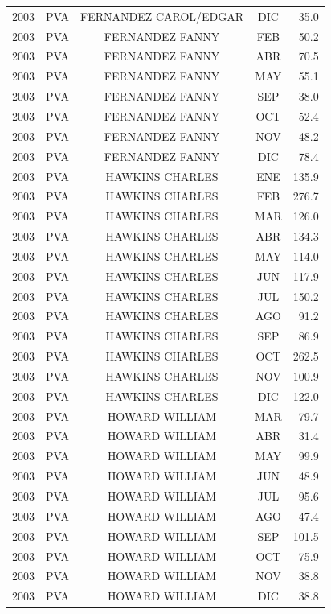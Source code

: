 \documentclass[12pt,]{article}
\begin{document}
\begin{table}[ht]
{\begin{tabular}{lcccr}
  2003 & PVA & FERNANDEZ CAROL/EDGAR & DIC & 35.0 \\ 
  2003 & PVA & FERNANDEZ FANNY & FEB & 50.2 \\ 
  2003 & PVA & FERNANDEZ FANNY & ABR & 70.5 \\ 
  2003 & PVA & FERNANDEZ FANNY & MAY & 55.1 \\ 
  2003 & PVA & FERNANDEZ FANNY & SEP & 38.0 \\ 
  2003 & PVA & FERNANDEZ FANNY & OCT & 52.4 \\ 
  2003 & PVA & FERNANDEZ FANNY & NOV & 48.2 \\ 
  2003 & PVA & FERNANDEZ FANNY & DIC & 78.4 \\ 
  2003 & PVA & HAWKINS CHARLES & ENE & 135.9 \\ 
  2003 & PVA & HAWKINS CHARLES & FEB & 276.7 \\ 
  2003 & PVA & HAWKINS CHARLES & MAR & 126.0 \\ 
  2003 & PVA & HAWKINS CHARLES & ABR & 134.3 \\ 
  2003 & PVA & HAWKINS CHARLES & MAY & 114.0 \\ 
  2003 & PVA & HAWKINS CHARLES & JUN & 117.9 \\ 
  2003 & PVA & HAWKINS CHARLES & JUL & 150.2 \\ 
  2003 & PVA & HAWKINS CHARLES & AGO & 91.2 \\ 
  2003 & PVA & HAWKINS CHARLES & SEP & 86.9 \\ 
  2003 & PVA & HAWKINS CHARLES & OCT & 262.5 \\ 
  2003 & PVA & HAWKINS CHARLES & NOV & 100.9 \\ 
  2003 & PVA & HAWKINS CHARLES & DIC & 122.0 \\ 
  2003 & PVA & HOWARD WILLIAM & MAR & 79.7 \\ 
  2003 & PVA & HOWARD WILLIAM & ABR & 31.4 \\ 
  2003 & PVA & HOWARD WILLIAM & MAY & 99.9 \\ 
  2003 & PVA & HOWARD WILLIAM & JUN & 48.9 \\ 
  2003 & PVA & HOWARD WILLIAM & JUL & 95.6 \\ 
  2003 & PVA & HOWARD WILLIAM & AGO & 47.4 \\ 
  2003 & PVA & HOWARD WILLIAM & SEP & 101.5 \\ 
  2003 & PVA & HOWARD WILLIAM & OCT & 75.9 \\ 
  2003 & PVA & HOWARD WILLIAM & NOV & 38.8 \\ 
  2003 & PVA & HOWARD WILLIAM & DIC & 38.8 \\ 

\end{tabular}}
\end{table}
\end{document}
